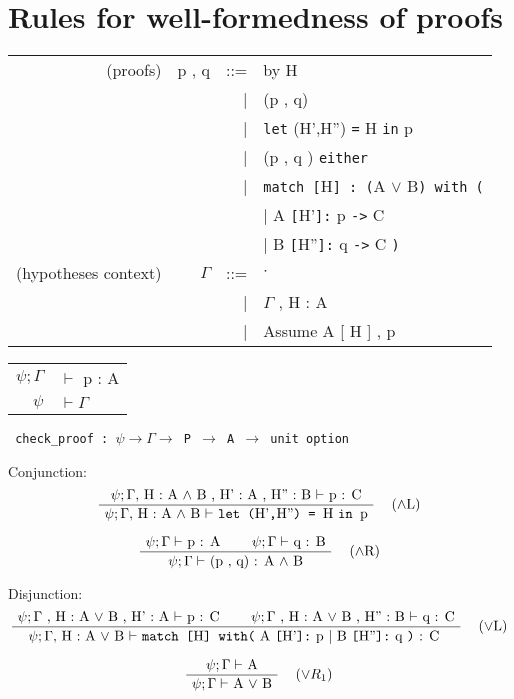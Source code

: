 \documentclass[twoside,a4paper]{article}
\begin{document}
\section{Rules for well-formedness of proofs}
\begin{center}
\begin{tabular}{rrrl}
(proofs)& p , q &::=& by H 
\\ &&|& (p , q) 
\\ &&|& {\tt let} (H',H'') {\tt =} H {\tt in} p
\\ &&|& (p , q ) {\tt either} 
\\ &&|& {\tt match [}H{\tt  ] : (}A $\vee$ B{\tt ) with (}
\\ &&&\qquad \qquad | A {\tt [}H'{\tt ]:} p {\tt ->} C 
\\ &&&\qquad \qquad | B {\tt [}H''{\tt ]:} q {\tt ->} C {\tt)}
\\
(hypotheses context)& $\Gamma$ &::=& \quad $\cdot$ \quad 
\\ &&| & $\Gamma$ , H : A
\\ &&| & Assume A [ H ] , p
\end{tabular}

\begin{tabular} {rl}
$\psi ; \Gamma$ &$\vdash$ p : A
\\
$\psi $ & $\vdash \Gamma$
\end{tabular}

{\tt
check_proof : $\psi \rightarrow \Gamma \rightarrow $ P 
$\rightarrow$ A $\rightarrow$ unit option
}
\end{center}

Conjunction:
\[
\AxiomC{$\psi ; \Gamma ,$ H : A $\wedge$ B , H' : A , H'' : B 
$\vdash$ p : C}
\RightLabel{\quad ($\wedge$L)}
\UnaryInfC{$\psi ; \Gamma ,$ H : A $\wedge$ B $\vdash$
{\tt let (}H'{\tt,}H''{\tt) = }H {\tt  in }p}
\DisplayProof
\]

\[
\AxiomC{$\psi ; \Gamma \vdash$ p : A}
\AxiomC{$\psi ; \Gamma \vdash$ q : B}
\RightLabel{\quad ($\wedge$R)}
\BinaryInfC{$\psi ; \Gamma \vdash$ (p , q) : A $\wedge$ B}
\DisplayProof
\]

Disjunction:
\[
\AxiomC{$\psi ; \Gamma$ , H : A $ \vee$ B , H' : A $\vdash$ p : C}
\AxiomC{$\psi ; \Gamma$ , H : A $ \vee$ B , H'' : B $\vdash$ q : C}
\RightLabel{\quad ($\vee$L)}
\BinaryInfC{$\psi ; \Gamma ,$  H : A 
$ \vee$ B $\vdash $
 {\tt  match [}H{\tt] with(}
 A {\tt [}H'{\tt ]:} p
 | B {\tt [}H''{\tt ]:} q {\tt)} : C
}
\DisplayProof
\]

\[
\AxiomC{$\psi ; \Gamma \vdash$ A}
\RightLabel{\quad ($\vee R_1$)}
\UnaryInfC{$\psi ; \Gamma \vdash$ A $\vee$ B}
\DisplayProof
\]
\end{document}
